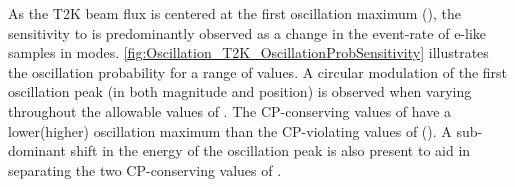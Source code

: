As the T2K beam flux is centered at the first oscillation maximum (), the sensitivity to \dcp is predominantly observed as a change in the event-rate of e-like samples in \quickmath{\nu/\bar{\nu}} modes. \autoref{fig:Oscillation_T2K_OscillationProbSensitivity} illustrates the  oscillation probability for a range of \dcp values. %
A circular modulation of the first oscillation peak (in both magnitude and position) is observed when varying throughout the allowable values of \dcp. The CP-conserving values of  have a lower(higher) oscillation maximum than the CP-violating values of (). A sub-dominant shift in the energy of the oscillation peak is also present to aid in separating the two CP-conserving values of \dcp.

